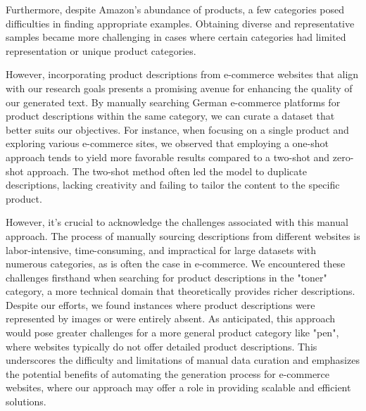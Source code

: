 Furthermore, despite Amazon's abundance of products, a few categories posed difficulties in finding appropriate examples. Obtaining diverse and representative samples became more challenging in cases where certain categories had limited representation or unique product categories. 


However, incorporating product descriptions from e-commerce websites that align with our research goals presents a promising avenue for enhancing the quality of our generated text. By manually searching German e-commerce platforms for product descriptions within the same category, we can curate a dataset that better suits our objectives. For instance, when focusing on a single product and exploring various e-commerce sites, we observed that employing a one-shot approach tends to yield more favorable results compared to a two-shot and zero-shot approach. The two-shot method often led the model to duplicate descriptions, lacking creativity and failing to tailor the content to the specific product.


\begin{center}
	\par
\end{center}

However, it's crucial to acknowledge the challenges associated with this manual approach. The process of manually sourcing descriptions from different websites is labor-intensive, time-consuming, and impractical for large datasets with numerous categories, as is often the case in e-commerce. We encountered these challenges firsthand when searching for product descriptions in the "toner" category, a more technical domain that theoretically provides richer descriptions. Despite our efforts, we found instances where product descriptions were represented by images or were entirely absent. As anticipated, this approach would pose greater challenges for a more general product category like "pen", where websites typically do not offer detailed product descriptions. This underscores the difficulty and limitations of manual data curation and emphasizes the potential benefits of automating the generation process for e-commerce websites, where our approach may offer a role in providing scalable and efficient solutions.

